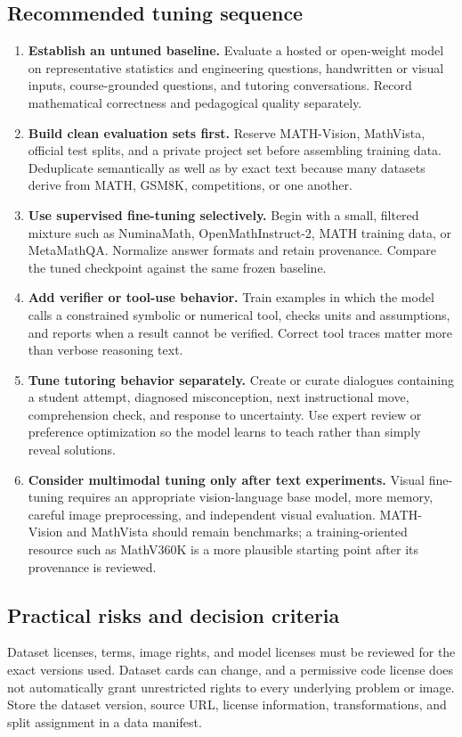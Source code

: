\documentclass[11pt]{article}
\begin{document}
\subsection{Recommended tuning sequence}
\begin{enumerate}
\item \textbf{Establish an untuned baseline.} Evaluate a hosted or open-weight model on representative statistics and engineering questions, handwritten or visual inputs, course-grounded questions, and tutoring conversations. Record mathematical correctness and pedagogical quality separately.
\item \textbf{Build clean evaluation sets first.} Reserve MATH-Vision, MathVista, official test splits, and a private project set before assembling training data. Deduplicate semantically as well as by exact text because many datasets derive from MATH, GSM8K, competitions, or one another.
\item \textbf{Use supervised fine-tuning selectively.} Begin with a small, filtered mixture such as NuminaMath, OpenMathInstruct-2, MATH training data, or MetaMathQA. Normalize answer formats and retain provenance. Compare the tuned checkpoint against the same frozen baseline.
\item \textbf{Add verifier or tool-use behavior.} Train examples in which the model calls a constrained symbolic or numerical tool, checks units and assumptions, and reports when a result cannot be verified. Correct tool traces matter more than verbose reasoning text.
\item \textbf{Tune tutoring behavior separately.} Create or curate dialogues containing a student attempt, diagnosed misconception, next instructional move, comprehension check, and response to uncertainty. Use expert review or preference optimization so the model learns to teach rather than simply reveal solutions.
\item \textbf{Consider multimodal tuning only after text experiments.} Visual fine-tuning requires an appropriate vision-language base model, more memory, careful image preprocessing, and independent visual evaluation. MATH-Vision and MathVista should remain benchmarks; a training-oriented resource such as MathV360K is a more plausible starting point after its provenance is reviewed.
\end{enumerate}

\subsection{Practical risks and decision criteria}
Dataset licenses, terms, image rights, and model licenses must be reviewed for the exact versions used. Dataset cards can change, and a permissive code license does not automatically grant unrestricted rights to every underlying problem or image. Store the dataset version, source URL, license information, transformations, and split assignment in a data manifest.
\end{document}
